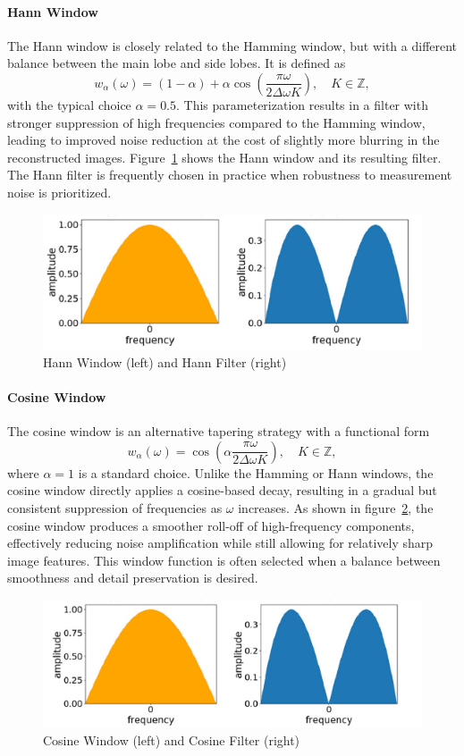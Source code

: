 \documentclass[12pt,a4paper]{article}
\begin{document}
\paragraph{Hann Window}
The Hann window is closely related to the Hamming window, but with a different balance between the main lobe and side lobes. It is defined as
\[
w_\alpha(\omega) = (1-\alpha) + \alpha \cos\left(\frac{\pi \omega}{2 \Delta \omega K}\right), 
\quad K \in \mathbb Z,
\]
with the typical choice $\alpha = 0.5$. This parameterization results in a filter with stronger suppression of high frequencies compared to the Hamming window, leading to improved noise reduction at the cost of slightly more blurring in the reconstructed images. Figure~\ref{fig8} shows the Hann window and its resulting filter. The Hann filter is frequently chosen in practice when robustness to measurement noise is prioritized.

\begin{figure}[h!]
    \centering
    \includegraphics[width=0.5\linewidth]{Bachelorthesis/UsedImages/fig8.png}
    \caption{Hann Window (left) and Hann Filter (right)}
    \label{fig8}
\end{figure}

\paragraph{Cosine Window}
The cosine window is an alternative tapering strategy with a functional form
\[
w_\alpha (\omega) = \cos\left(\alpha \frac{\pi \omega}{2 \Delta \omega K}\right), 
\quad K \in \mathbb Z,
\]
where $\alpha = 1$ is a standard choice. Unlike the Hamming or Hann windows, the cosine window directly applies a cosine-based decay, resulting in a gradual but consistent suppression of frequencies as $\omega$ increases. As shown in figure~\ref{fig9}, the cosine window produces a smoother roll-off of high-frequency components, effectively reducing noise amplification while still allowing for relatively sharp image features. This window function is often selected when a balance between smoothness and detail preservation is desired.

\begin{figure}[h!]
    \centering
    \includegraphics[width=0.5\linewidth]{Bachelorthesis/UsedImages/fig9.png}
    \caption{Cosine Window (left) and Cosine Filter (right)}
    \label{fig9}
\end{figure}
\end{document}
